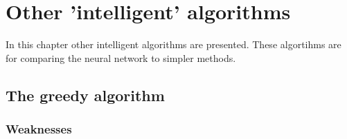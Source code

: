 \documentclass[10pt,a4paper,DIV=11]{scrreprt}
\begin{document}
\chapter{Other 'intelligent' algorithms}
In this chapter other intelligent algorithms are presented.
These algortihms are for comparing the neural network to simpler
methods.

\section{The greedy algorithm}

\subsection{Weaknesses}




\newpage


\listoffigures
\listoftables
\listofalgorithms
\lstlistoflistings

\newpage




\end{document}
